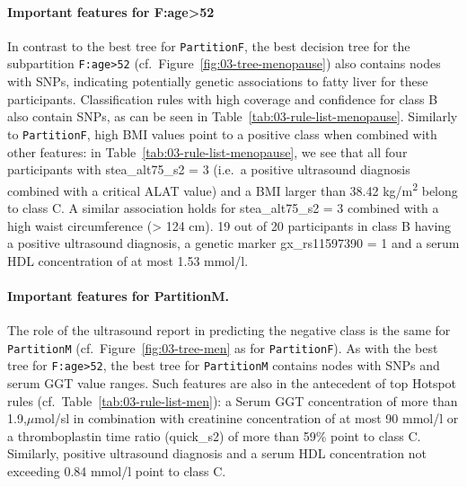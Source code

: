 \documentclass[
  oneside]{book}
\begin{document}
\paragraph*{Important features for F:age>52}

In contrast to the best tree for \texttt{PartitionF}, the best decision tree for the subpartition \texttt{F:age\textgreater{}52} (cf.~Figure~\ref{fig:03-tree-menopause}) also contains nodes with SNPs, indicating potentially genetic associations to fatty liver for these participants.
Classification rules with high coverage and confidence for class B also contain SNPs, as can be seen in Table~\ref{tab:03-rule-list-menopause}.
Similarly to \texttt{PartitionF}, high BMI values point to a positive class when combined with other features: in Table~\ref{tab:03-rule-list-menopause}, we see that all four participants with stea\_alt75\_s2 = 3 (i.e.~a positive ultrasound diagnosis combined with a critical ALAT value) and a BMI larger than 38.42 kg/m\textsuperscript{2} belong to class C.
A similar association holds for stea\_alt75\_s2 = 3 combined with a high waist circumference (\textgreater{} 124 cm).
19 out of 20 participants in class B having a positive ultrasound diagnosis, a genetic marker gx\_rs11597390 = 1 and a serum HDL concentration of at most 1.53 mmol/l.

\paragraph*{Important features for PartitionM.}

The role of the ultrasound report in predicting the negative class is the same for \texttt{PartitionM} (cf.~Figure~\ref{fig:03-tree-men} as for \texttt{PartitionF}).
As with the best tree for \texttt{F:age\textgreater{}52}, the best tree for \texttt{PartitionM} contains nodes with SNPs and serum GGT value ranges.
Such features are also in the antecedent of top Hotspot rules (cf.~Table~\ref{tab:03-rule-list-men}): a Serum GGT concentration of more than 1.9,\(\mu\)mol/sl in combination with creatinine concentration of at most 90 mmol/l or a thromboplastin time ratio (quick\_s2) of more than 59\% point to class C.
Similarly, positive ultrasound diagnosis and a serum HDL concentration not exceeding 0.84 mmol/l point to class C.
\end{document}
